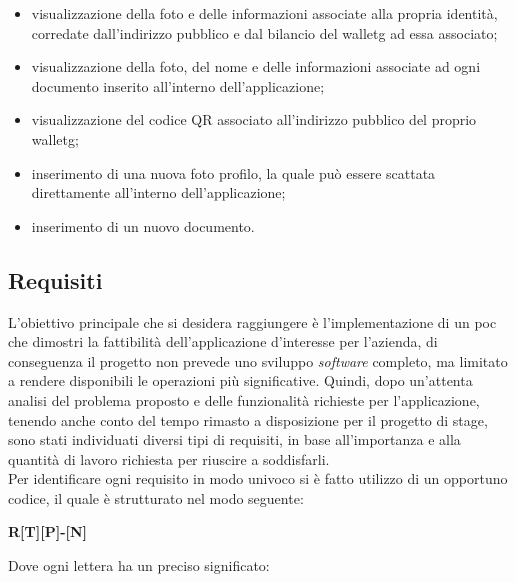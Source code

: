\begin{itemize}
	\item visualizzazione della foto e delle informazioni associate alla propria identità, corredate dall'indirizzo pubblico e dal bilancio del \gls{walletg} ad essa associato;
	\item visualizzazione della foto, del nome e delle informazioni associate ad ogni documento inserito all'interno dell'applicazione;
	\item visualizzazione del codice QR associato all'indirizzo pubblico del proprio \gls{walletg};
	\item inserimento di una nuova foto profilo, la quale può essere scattata direttamente all'interno dell'applicazione;
	\item inserimento di un nuovo documento.
\end{itemize}

\subsection{Requisiti}

L'obiettivo principale che si desidera raggiungere è l'implementazione di un \gls{poc} che dimostri la fattibilità dell'applicazione d'interesse per l'azienda, di conseguenza il progetto non prevede uno sviluppo \textit{software} completo, ma limitato a rendere disponibili le operazioni più significative. Quindi, dopo un'attenta analisi del problema proposto e delle funzionalità richieste per l'applicazione, tenendo anche conto del tempo rimasto a disposizione per il progetto di stage, sono stati individuati diversi tipi di requisiti, in base all'importanza e alla quantità di lavoro richiesta per riuscire a soddisfarli.\\
Per identificare ogni requisito in modo univoco si è fatto utilizzo di un opportuno codice, il quale è strutturato nel modo seguente:\\

\begin{center}
	\textbf{R[T][P]-[N]}
\end{center}

Dove ogni lettera ha un preciso significato:

